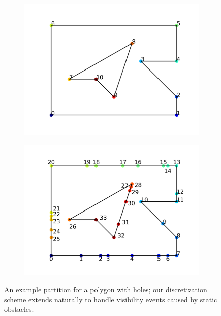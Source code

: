 \documentclass[]{article}
\begin{document}
%
%
\begin{figure}
\centering
\begin{subfigure}{0.5\textwidth}
\centering
\includegraphics[width=0.8\linewidth]{figures/median_holes.png}
\centering
\end{subfigure}%
\begin{subfigure}{0.5\textwidth}
\centering
\includegraphics[width=0.8\linewidth]{figures/median_holes_inserted.png}
\centering
\end{subfigure}
\caption{An example partition for a polygon with holes; our discretization
scheme extends naturally to handle visibility events caused by static obstacles.}
\label{fig:bvd_holes}
\end{figure}
\end{document}
